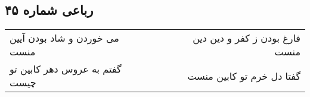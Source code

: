 \begin{center}
\section*{رباعی شماره ۴۵}
\label{sec:sh045}
\begin{longtable}{l p{0.5cm} r}
می خوردن و شاد بودن آیین منست
&&
فارغ بودن ز کفر و دین دین منست
\\
گفتم به عروس دهر کابین تو چیست
&&
گفتا دل خرم تو کابین منست
\\
\end{longtable}
\end{center}

